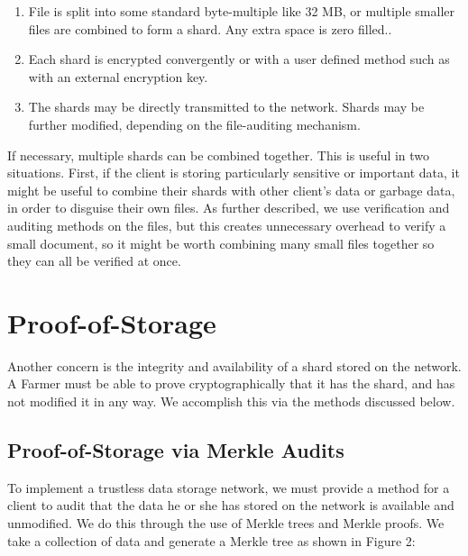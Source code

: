\documentclass[a4paper,10pt]{article}
\begin{document}
\begin{enumerate}
\item File is split into some standard byte-multiple like 32 MB, or multiple smaller files are combined to form a shard. Any extra space is zero filled..
\item Each shard is encrypted convergently or with a user defined method such as with an external encryption key.
\item The shards may be directly transmitted to the network. Shards may be further modified, depending on the file-auditing mechanism.
\end{enumerate}

If necessary, multiple shards can be combined together. This is useful in two situations. First, if the client is storing particularly sensitive or important data, it might be useful to combine their shards with other client’s data or garbage data, in order to disguise their own files. As further described, we use verification and auditing methods on the files, but this creates unnecessary overhead to verify a small document, so it might be worth combining many small files together so they can all be verified at once.



\section{Proof-of-Storage}

Another concern is the integrity and availability of a shard stored on the network. A Farmer must be able to prove cryptographically that it has the shard, and has not modified it in any way. We accomplish this via the methods discussed below.
\subsection{Proof-of-Storage via Merkle Audits}

To implement a trustless data storage network, we must provide a method for a client to audit that the data he or she has stored on the network is available and unmodified. We do this through the use of Merkle trees \cite{2} and Merkle proofs. We take a collection of data and generate a Merkle tree as shown in Figure 2:\\
\end{document}
